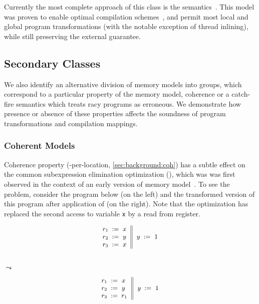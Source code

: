 Currently the most complete approach of this class 
is the \Promising semantics~\cite{Kang-al:POPL17, Lee-al:PLDI20}. 
This model was proven to enable optimal compilation schemes~\cite{Podkopaev-al:POPL19}, 
and permit most local and global program transformations
(with the notable exception of thread inlining), 
while still preserving the external \DRF guarantee.

\subsection{Secondary Classes}
\label{sec:analysis:other}

We also identify an alternative division of memory models into groups, 
which correspond to a particular property of the memory model, 
\eg coherence or a catch-fire semantics which treats racy programs 
as erroneous. We demonstrate how presence or absence of these properties 
affects the soundness of program transformations and compilation mappings.

\subsubsection{Coherent Models}
\label{sec:analysis:coh}

Coherence property (\ie \SC-per-location, \cref{sec:background:coh})
has a subtle effect on the common subexpression elimination optimization (\CSE),
which was was first observed in the context of an early version of \Java 
memory model~\cite{Pugh:JAVA99}.
To see the problem, consider the program below
(on the left) and the transformed version 
of this program after application of \CSE (on the right).
Note that the optimization has replaced 
the second access to variable \texttt{x}
by a read from register. 

\begin{minipage}{0.45\linewidth}
\begin{equation*}
\small
\inarrII{
  \readInst{}{r_1}{x}      \\
  \readInst{}{r_2}{y}      \\
  \readInst{}{r_3}{x}      \\
}{
  \writeInst{}{y}{1}       \\
}
\label{ex:coh-rr}
\end{equation*}
\end{minipage}\hfill%
\begin{minipage}{0.05\linewidth}
\Large~\\ $\leadsto$
\end{minipage}\hfill%
\begin{minipage}{0.45\linewidth}
\begin{equation*}
\small
\inarrII{
  \readInst{}{r_1}{x}      \\
  \readInst{}{r_2}{y}      \\
  \assignInst{r_3}{r_1}    \\
}{
  \writeInst{}{y}{1}       \\
}
\label{ex:coh-rr}
\end{equation*}
\end{minipage}


